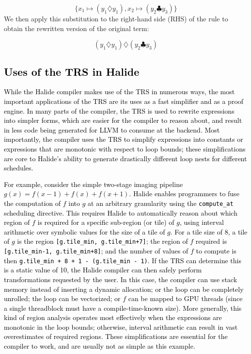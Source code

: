 \documentclass[acmsmall]{acmart}\settopmatter{}
\newcommand{\modified}[1]{\textcolor{black}{{#1}}}
\begin{document}
\[
\{ x_1 \mapsto (y_1 \diamondsuit y_1), x_2 \mapsto (y_2 \clubsuit y_3) \}
\]
We then apply this substitution to the right-hand side (RHS) of the rule to obtain the rewritten version of the original term:

\[ 
(y_1 \diamondsuit y_1) \diamondsuit (y_2 \clubsuit y_3)
\]

\subsection{\modified{Uses of the TRS in Halide}}
\label{sec:uses-of-trs}
\modified{While the Halide compiler makes use of the TRS in numerous ways, the most important
  applications of the TRS are its uses as a fast simplifier and as a proof engine.  
  In many parts of the compiler, the TRS is used to rewrite expressions into simpler forms,
  which are easier for the compiler to reason about, and result in less code being generated for
  LLVM to consume at the backend.  Most importantly, the compiler uses the TRS to simplify expressions
  into constants or expressions that are monotonic with respect to loop bounds; these simplifications are core to Halide's
  ability to generate drastically different loop nests for different schedules.}

\modified{For example, consider the simple two-stage imaging pipeline $g(x) = f(x - 1) + f(x) + f(x + 1)$.
  Halide enables programmers to fuse the computation of $f$ into $g$ at an arbitrary granularity
  using the \texttt{compute\_at} scheduling directive.  This requires Halide to automatically reason
  about which region of $f$ is required for a specific sub-region (or tile) of $g$, using interval
  arithmetic over symbolic values for the size of a tile of $g$.  For a tile size of 8, a tile of $g$
  is the region \texttt{[g.tile\_min, g.tile\_min+7]};  the region of $f$ required is
  \texttt{[g.tile\_min-1, g.tile\_min+8]}; and the number of values of $f$ to compute is then
  \texttt{g.tile\_min + 8 + 1 - (g.tile\_min - 1)}.  If the TRS can determine this is a static value
  of 10, the Halide compiler can then safely perform transformations requested by the user.  In this
  case, the compiler can use stack memory instead of inserting a dynamic allocation; or the loop can be
  completely unrolled; the loop can be vectorized; or $f$ can be mapped to GPU threads (since a single
  threadblock must have a compile-time-known size).  More generally, this kind of region analysis
  operates most effectively when the expressions are monotonic in the loop bounds; otherwise, interval
  arithmetic can result in vast overestimates of required regions.  These simplifications are essential
  for the compiler to work, and are usually not as simple as this example.}
\end{document}
